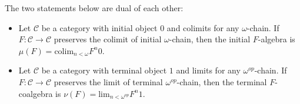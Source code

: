 \begin{thm}
	The two statements below are dual of each other:
	
	\begin{itemize}
		\item Let $\mathcal{C}$ be a category with initial object $0$ and colimits for any $\omega$-chain. If $F: \mathcal{C} \to \mathcal{C}$ preserves the colimit of initial $\omega$-chain, then the initial $F$-algebra is $\mu(F) = \text{colim}_{n < \omega} F^n 0$.
		\item Let $\mathcal{C}$ be a category with terminal object $1$ and limits for any $\omega^{op}$-chain. If $F: \mathcal{C} \to \mathcal{C}$ preserves the limit of terminal $\omega^{op}$-chain, then the terminal $F$-coalgebra is $\nu(F) = \text{lim}_{n < \omega^{op}} F^n 1$.
	\end{itemize}
	
\end{thm}
